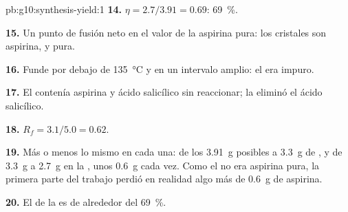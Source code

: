 \begin{solution}{pb:g10:synthesis-yield:1}
\textbf{14.} $\eta = 2.7 / 3.91 = 0.69$: \qty{69}{\percent}.

\textbf{15.} Un punto de fusión neto en el valor de la aspirina pura:
los cristales son aspirina, y pura.

\textbf{16.} Funde por debajo de \qty{135}{\celsius} y en un intervalo
amplio: el  era impuro.

\textbf{17.} El  contenía aspirina y ácido salicílico sin
reaccionar; la  eliminó el ácido salicílico.

\textbf{18.} $R_f = 3.1 / 5.0 = 0.62$.

\textbf{19.} Más o menos lo mismo en cada una: de los \qty{3.91}{g}
posibles a \qty{3.3}{g} de , y de \qty{3.3}{g} a
\qty{2.7}{g} en la , unos \qty{0.6}{g} cada vez. Como el
 no era aspirina pura, la primera parte del trabajo perdió
en realidad algo más de \qty{0.6}{g} de aspirina.

\textbf{20.} El  de la  es de alrededor del
\qty{69}{\percent}.
\end{solution}
